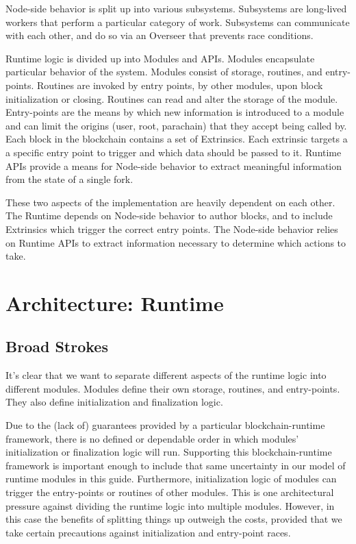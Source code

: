 Node-side behavior is split up into various subsystems. Subsystems are
long-lived workers that perform a particular category of work. Subsystems can
communicate with each other, and do so via an Overseer that prevents race
conditions.
\newline

Runtime logic is divided up into Modules and APIs. Modules encapsulate
particular behavior of the system. Modules consist of storage, routines, and
entry-points. Routines are invoked by entry points, by other modules, upon block
initialization or closing. Routines can read and alter the storage of the
module. Entry-points are the means by which new information is introduced to a
module and can limit the origins (user, root, parachain) that they accept being
called by. Each block in the blockchain contains a set of Extrinsics. Each
extrinsic targets a a specific entry point to trigger and which data should be
passed to it. Runtime APIs provide a means for Node-side behavior to extract
meaningful information from the state of a single fork.
\newline

These two aspects of the implementation are heavily dependent on each other. The
Runtime depends on Node-side behavior to author blocks, and to include
Extrinsics which trigger the correct entry points. The Node-side behavior relies
on Runtime APIs to extract information necessary to determine which actions to
take.

\section{Architecture: Runtime}

\subsection{Broad Strokes}

It's clear that we want to separate different aspects of the runtime logic into
different modules. Modules define their own storage, routines, and entry-points.
They also define initialization and finalization logic.
\newline

Due to the (lack of) guarantees provided by a particular blockchain-runtime
framework, there is no defined or dependable order in which modules'
initialization or finalization logic will run. Supporting this
blockchain-runtime framework is important enough to include that same
uncertainty in our model of runtime modules in this guide. Furthermore,
initialization logic of modules can trigger the entry-points or routines of
other modules. This is one architectural pressure against dividing the runtime
logic into multiple modules. However, in this case the benefits of splitting
things up outweigh the costs, provided that we take certain precautions against
initialization and entry-point races.
\newline

